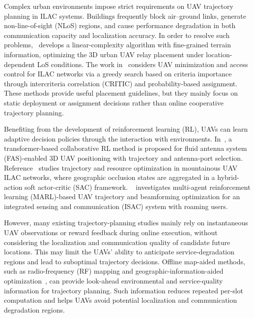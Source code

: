 \documentclass[10pt,journal,letterpaper]{IEEEtran}
\begin{document}
Complex urban environments impose strict requirements on UAV trajectory planning in ILAC systems. Buildings frequently block air--ground links, generate non-line-of-sight (NLoS) regions, and cause performance degradation in both communication capacity and localization accuracy. In order to resolve such problems,~\cite{ref5} develops a linear-complexity algorithm with fine-grained terrain information, optimizing the 3D urban UAV relay placement under location-dependent LoS conditions. The work in~\cite{ref6} considers UAV minimization and access control for ILAC networks via a greedy search based on criteria importance through intercriteria correlation (CRITIC) and probability-based assignment. These methods provide useful placement guidelines, but they mainly focus on static deployment or assignment decisions rather than online cooperative trajectory planning.

Benefiting from the development of reinforcement learning (RL), UAVs can learn adaptive decision policies through the interaction with environments. In~\cite{ref7}, a transformer-based collaborative RL method is proposed for fluid antenna system (FAS)-enabled 3D UAV positioning with trajectory and antenna-port selection. Reference~\cite{ref8} studies trajectory and resource optimization in mountainous UAV ILAC networks, where geographic occlusion states are aggregated in a hybrid-action soft actor-critic (SAC) framework. ~\cite{ref9} investigates multi-agent reinforcement learning (MARL)-based UAV trajectory and beamforming optimization for an integrated sensing and communication (ISAC) system with roaming users.

However, many existing trajectory-planning studies mainly rely on instantaneous UAV observations or reward feedback during online execution, without considering the localization and communication quality of candidate future locations. This may limit the UAVs' ability to anticipate service-degradation regions and lead to suboptimal trajectory decisions. Offline map-aided methods, such as radio-frequency (RF) mapping and geographic-information-aided optimization~\cite{ref10,ref11}, can provide look-ahead environmental and service-quality information for trajectory planning. Such information reduces repeated per-slot computation and helps UAVs avoid potential localization and communication degradation regions.
\end{document}
